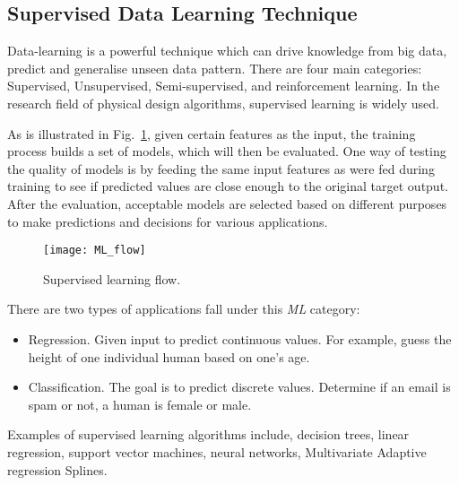 \subsection{Supervised Data Learning Technique}
Data-learning is a powerful technique which can drive knowledge from big data, predict and generalise unseen data pattern. There are four main categories: Supervised, Unsupervised, Semi-supervised, and reinforcement learning. In the research field of physical design algorithms, supervised learning is widely used.

As is illustrated in Fig.~\ref{fig:ml_flow}, given certain features as the input, the training process builds a set of models, which will then be evaluated. One way of testing the quality of models is by feeding the same input features as were fed during training to see if predicted values are close enough to the original target output. After the evaluation, acceptable models are selected based on different purposes to make predictions and decisions for various applications. 
\begin{figure}[tb!]
    \centering
    \texttt{[image: ML\_flow]}
    \caption{Supervised learning flow.}
    \label{fig:ml_flow}
\end{figure}
There are two types of applications fall under this \textit{ML} category:
\begin{itemize}
\item Regression. Given input to predict continuous values. For example, guess the height of one individual human based on one's age. 
\item Classification. The goal is to predict discrete values. Determine if an email is spam or not, a human is female or male. 
\end{itemize}

Examples of supervised learning algorithms include, decision trees, linear regression, support vector machines, neural networks, Multivariate Adaptive regression Splines.
